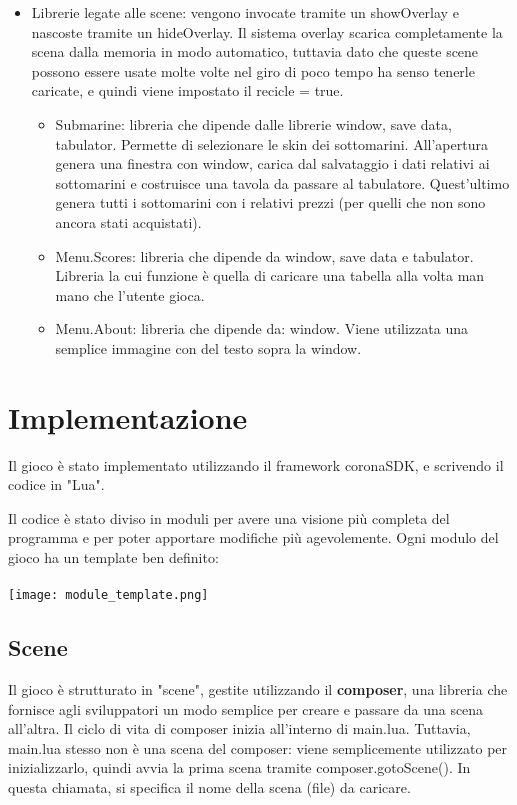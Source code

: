\documentclass[12pt]{article}
\begin{document}
\begin{itemize}
\begin{itemize}
    \end{itemize}
    
    \item Librerie legate alle scene: vengono invocate tramite un showOverlay e nascoste tramite un hideOverlay. Il sistema overlay scarica completamente la scena dalla memoria in modo automatico, tuttavia dato che queste scene possono essere usate molte volte nel giro di poco tempo ha senso tenerle caricate, e quindi viene impostato il recicle = true.
        \begin{itemize}
            \item Submarine: libreria che dipende dalle librerie window, save data, tabulator. Permette di selezionare le skin dei sottomarini. All’apertura genera una finestra con window, carica dal salvataggio i dati relativi ai sottomarini e costruisce una tavola da passare al tabulatore. Quest'ultimo genera tutti i sottomarini con i relativi prezzi (per quelli che non sono ancora stati acquistati). 
            \item Menu.Scores: libreria che dipende da window, save data e tabulator. Libreria la cui funzione è quella di caricare una tabella alla volta man mano che l'utente gioca. 
            \item Menu.About:  libreria che dipende da: window. Viene utilizzata una semplice immagine con del testo sopra la window. 
        \end{itemize}
    
\end{itemize}
\section{Implementazione}
Il gioco è stato implementato utilizzando il framework coronaSDK, e scrivendo il codice in "Lua". 


Il codice è stato diviso in moduli per avere una visione più completa del programma e per poter apportare modifiche più agevolemente. 
Ogni modulo del gioco ha un template ben definito:
\\\\


\texttt{[image: module\_template.png]}\\


\subsection{Scene}
Il gioco è strutturato in "scene", gestite utilizzando il \textbf{composer}, una libreria che fornisce agli sviluppatori  un modo semplice per creare e passare da una scena all'altra. Il ciclo di vita di composer inizia all'interno di main.lua. Tuttavia, main.lua stesso non è una scena del composer: viene semplicemente utilizzato per inizializzarlo, quindi avvia la prima scena tramite composer.gotoScene(). In questa chiamata, si specifica il nome della scena (file) da caricare. 
\end{document}

